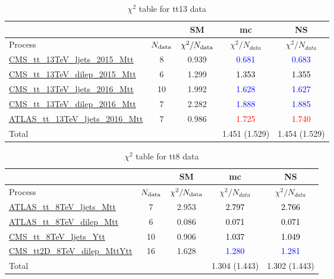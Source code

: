 \documentclass{article}
\begin{document}
\begin{table}[H]
\centering
\begin{tabular}{|l|c|c|c|c|}
\hline
 \multicolumn{2}{|c|}{} & SM& mc& NS\\ \hline
Process & $N_{\rm data}$ & $\chi^ 2/N_{\rm data}$& $\chi^ 2/N_{data}$& $\chi^ 2/N_{data}$\\ \hline
\href{https://arxiv.org/abs/1610.04191}{CMS_tt_13TeV_ljets_2015_Mtt} & 8 & 0.939 & \textcolor{blue}{0.681} & \textcolor{blue}{0.683} \\ \hline
\href{https://arxiv.org/abs/1708.07638}{CMS_tt_13TeV_dilep_2015_Mtt} & 6 & 1.299 & \textcolor{black}{1.353} & \textcolor{black}{1.355} \\ \hline
\href{https://arxiv.org/abs/1803.08856}{CMS_tt_13TeV_ljets_2016_Mtt} & 10 & 1.992 & \textcolor{blue}{1.628} & \textcolor{blue}{1.627} \\ \hline
\href{https://arxiv.org/abs/1811.06625}{CMS_tt_13TeV_dilep_2016_Mtt} & 7 & 2.282 & \textcolor{blue}{1.888} & \textcolor{blue}{1.885} \\ \hline
\href{https://arxiv.org/abs/1908.07305}{ATLAS_tt_13TeV_ljets_2016_Mtt} & 7 & 0.986 & \textcolor{red}{1.725} & \textcolor{red}{1.740} \\ \hline
\hline Total & &  & 1.451 (1.529) & 1.454 (1.529) \\ \hline
\end{tabular}
\caption{$\chi^2$ table for tt13 data}
\end{table}
\begin{table}[H]
\centering
\begin{tabular}{|l|c|c|c|c|}
\hline
 \multicolumn{2}{|c|}{} & SM& mc& NS\\ \hline
Process & $N_{\rm data}$ & $\chi^ 2/N_{\rm data}$& $\chi^ 2/N_{data}$& $\chi^ 2/N_{data}$\\ \hline
\href{https://arxiv.org/abs/1511.04716}{ATLAS_tt_8TeV_ljets_Mtt} & 7 & 2.953 & \textcolor{black}{2.797} & \textcolor{black}{2.766} \\ \hline
\href{https://arxiv.org/abs/1607.07281}{ATLAS_tt_8TeV_dilep_Mtt} & 6 & 0.086 & \textcolor{black}{0.071} & \textcolor{black}{0.071} \\ \hline
\href{https://arxiv.org/abs/1505.04480}{CMS_tt_8TeV_ljets_Ytt} & 10 & 0.906 & \textcolor{black}{1.037} & \textcolor{black}{1.049} \\ \hline
\href{https://arxiv.org/abs/1703.01630}{CMS_tt2D_8TeV_dilep_MttYtt} & 16 & 1.628 & \textcolor{blue}{1.280} & \textcolor{blue}{1.281} \\ \hline
\hline Total & &  & 1.304 (1.443) & 1.302 (1.443) \\ \hline
\end{tabular}
\caption{$\chi^2$ table for tt8 data}
\end{table}
\end{document}
